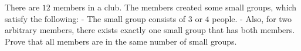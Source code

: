 There are $12$ members in a club. The members created some small groups, which satisfy the following:
- The small group consists of $3$ or $4$ people.
- Also, for two arbitrary members, there exists exactly one small group that has both members.
Prove that all members are in the same number of small groups.